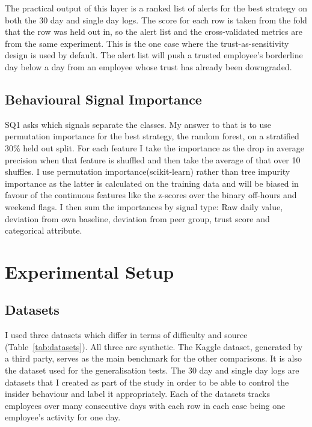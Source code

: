 \documentclass[a4paper,12pt]{article}
\begin{document}
The practical output of this layer is a ranked list of alerts for the best strategy on both the 30 day and single day logs. The score for each row is taken from the fold that the row was held out in, so the alert list and the cross-validated metrics are from the same experiment. This is the one case where the trust-as-sensitivity design is used by default. The alert list will push a trusted employee's borderline day below a day from an employee whose trust has already been downgraded.

\subsection{Behavioural Signal Importance}
\label{sec:6.8}

SQ1 asks which signals separate the classes. My answer to that is to use permutation importance for the best strategy, the random forest, on a stratified 30\% held out split. For each feature I take the importance as the drop in average precision when that feature is shuffled and then take the average of that over 10 shuffles. I use permutation importance(scikit-learn) rather than tree impurity importance as the latter is calculated on the training data and will be biased in favour of the continuous features like the z-scores over the binary off-hours and weekend flags. I then sum the importances by signal type: Raw daily value, deviation from own baseline, deviation from peer group, trust score and categorical attribute.

\section{Experimental Setup}
\label{sec:7}

\subsection{Datasets}
\label{sec:7.1}

I used three datasets which differ in terms of difficulty and source (Table~\ref{tab:datasets}). All three are synthetic. The Kaggle dataset, generated by a third party, serves as the main benchmark for the other comparisons. It is also the dataset used for the generalisation tests. The 30 day and single day logs are datasets that I created as part of the study in order to be able to control the insider behaviour and label it appropriately. Each of the datasets tracks employees over many consecutive days with each row in each case being one employee's activity for one day.
\end{document}
